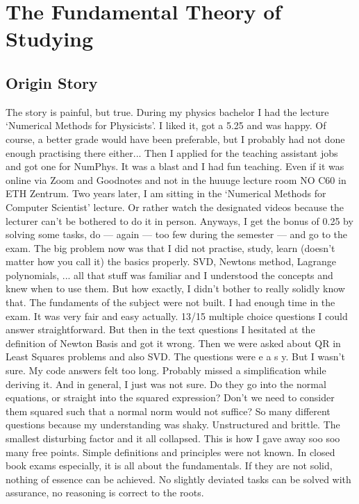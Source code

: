 \section{The Fundamental Theory of Studying}

\subsection{Origin Story}
The story is painful, but true. During my physics bachelor I had the lecture `Numerical Methods for Physicists'. I liked it, got a 5.25 and was happy. Of course, a better grade would have been preferable, but I probably had not done enough practising there either... Then I applied for the teaching assistant jobs and got one for NumPhys. It was a blast and I had fun teaching. Even if it was online via Zoom and Goodnotes and not in the huuuge lecture room NO C60 in ETH Zentrum. Two years later, I am sitting in the `Numerical Methods for Computer Scientist' lecture. Or rather watch the designated videos because the lecturer can't be bothered to do it in person. Anyways, I get the bonus of 0.25 by solving some tasks, do — again — too few during the semester — and go to the exam. The big problem now was that I did not practise, study, learn (doesn't matter how you call it) the basics properly. SVD, Newtons method, Lagrange polynomials, ... all that stuff was familiar and I understood the concepts and knew when to use them. But how exactly, I didn't bother to really solidly know that. The fundaments of the subject were not built. I had enough time in the exam. It was very fair and easy actually. 13/15 multiple choice questions I could answer straightforward. But then in the text questions I hesitated at the definition of Newton Basis and got it wrong. Then we were asked about QR in Least Squares problems and also SVD. The questions were e a s y. But I wasn't sure. My code answers felt too long. Probably missed a simplification while deriving it. And in general, I just was not sure. Do they go into the normal equations, or straight into the squared expression? Don't we need to consider them squared such that a normal norm would not suffice? 
So many different questions because my understanding was shaky. Unstructured and brittle. The smallest disturbing factor and it all collapsed. This is how I gave away soo soo many free points. Simple definitions and principles were not known. In closed book exams especially, it is all about the fundamentals. If they are not solid, nothing of essence can be achieved. No slightly deviated tasks can be solved with assurance, no reasoning is correct to the roots. 

